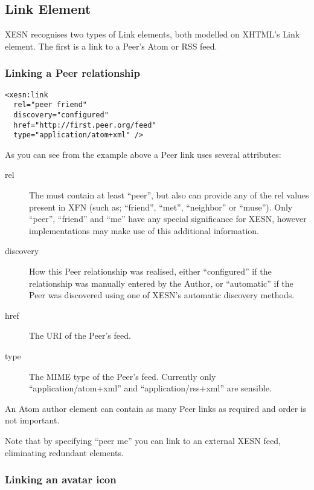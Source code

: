 \documentclass[titlepage,english,a4paper,twoside,dvips]{article}
\begin{document}
\subsection{Link Element}

XESN recognises two types of Link elements, both modelled on XHTML's Link element.  The first is a link to a Peer's Atom or RSS feed.

\subsubsection{Linking a Peer relationship}

\begin{verbatim}
<xesn:link 
  rel="peer friend" 
  discovery="configured" 
  href="http://first.peer.org/feed" 
  type="application/atom+xml" />
\end{verbatim}

As you can see from the example above a Peer link uses several attributes:

\begin{description}

\item[rel] The must contain at least ``peer'', but also can provide any of the rel values present in XFN (such as; ``friend'', ``met'', ``neighbor'' or ``muse'').  Only ``peer'', ``friend'' and ``me'' have any special significance for XESN, however implementations may make use of this additional information.

\item[discovery] How this Peer relationship was realised, either ``configured'' if the relationship was manually entered by the Author, or ``automatic'' if the Peer was discovered using one of XESN's automatic discovery methods. 

\item[href] The URI of the Peer's feed.

\item[type] The MIME type of the Peer's feed.  Currently only ``application/atom+xml'' and ``application/rss+xml'' are sensible.

\end{description}

An Atom author element can contain as many Peer links as required and order is not important.

Note that by specifying ``peer me'' you can link to an external XESN feed, eliminating redundant elements.

\subsubsection{Linking an avatar icon}
\end{document}
